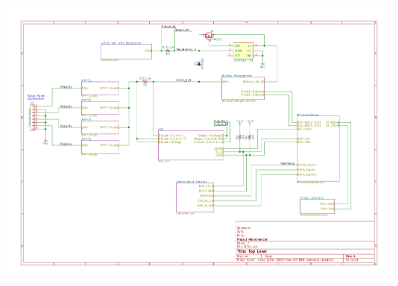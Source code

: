 \documentclass{article}
\numberwithin{figure}{section}
\numberwithin{equation}{section}
\begin{document}
{\begin{figure}[H]
	\centering
	\includegraphics[page=1,width=0.9\textwidth]{RFCxSchematics.pdf}
	\caption{}
	\label{fig:schemp1}
\end{figure}

\newpage
}
\end{document}
